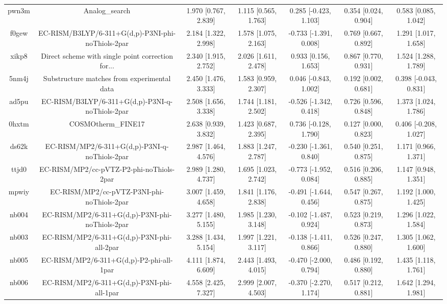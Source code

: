 \documentclass{article}
\begin{document}
\begin{center}
\begin{longtable}{|ccccccc|}
 pwn3m &                                     Analog\_search &  1.970 [0.767, 2.839] &  1.115 [0.565, 1.763] &    0.285 [-0.423, 1.103] &  0.354 [0.024, 0.904] &   0.583 [0.085, 1.042] \\
 f0gew &  EC-RISM/B3LYP/6-311+G(d,p)-P3NI-phi-noThiols-2par &  2.184 [1.322, 2.998] &  1.578 [1.075, 2.163] &   -0.733 [-1.391, 0.008] &  0.769 [0.667, 0.892] &   1.291 [1.017, 1.658] \\
 xikp8 &  Direct scheme with single point correction for... &  2.340 [1.915, 2.752] &  2.026 [1.611, 2.478] &     0.933 [0.156, 1.653] &  0.867 [0.770, 0.931] &   1.524 [1.288, 1.789] \\
 5nm4j &        Substructure matches from experimental data &  2.450 [1.476, 3.333] &  1.583 [0.959, 2.307] &    0.046 [-0.843, 1.002] &  0.192 [0.002, 0.681] &  0.398 [-0.043, 0.831] \\
 ad5pu &    EC-RISM/B3LYP/6-311+G(d,p)-P3NI-q-noThiols-2par &  2.508 [1.656, 3.338] &  1.744 [1.181, 2.502] &   -0.526 [-1.342, 0.418] &  0.726 [0.596, 0.848] &   1.373 [1.024, 1.786] \\
 0hxtm &                                 COSMOtherm\_FINE17 &  2.638 [0.939, 3.832] &  1.423 [0.687, 2.395] &    0.736 [-0.128, 1.790] &  0.127 [0.000, 0.823] &  0.406 [-0.208, 1.027] \\
 ds62k &      EC-RISM/MP2/6-311+G(d,p)-P3NI-q-noThiols-2par &  2.987 [1.464, 4.576] &  1.883 [1.247, 2.787] &   -0.230 [-1.361, 0.840] &  0.540 [0.251, 0.875] &   1.171 [0.966, 1.371] \\
 ttjd0 &           EC-RISM/MP2/cc-pVTZ-P2-phi-noThiols-2par &  2.989 [1.280, 4.737] &  1.695 [1.023, 2.742] &   -0.773 [-1.952, 0.084] &  0.516 [0.206, 0.885] &   1.147 [0.948, 1.351] \\
 mpwiy &         EC-RISM/MP2/cc-pVTZ-P3NI-phi-noThiols-2par &  3.007 [1.459, 4.658] &  1.841 [1.176, 2.838] &   -0.491 [-1.644, 0.456] &  0.547 [0.267, 0.875] &   1.192 [1.000, 1.425] \\
 nb004 &    EC-RISM/MP2/6-311+G(d,p)-P3NI-phi-noThiols-2par &  3.277 [1.480, 5.155] &  1.985 [1.230, 3.148] &   -0.102 [-1.487, 0.924] &  0.523 [0.219, 0.873] &   1.296 [1.022, 1.584] \\
 nb003 &         EC-RISM/MP2/6-311+G(d,p)-P3NI-phi-all-2par &  3.288 [1.434, 5.154] &  1.997 [1.221, 3.117] &   -0.138 [-1.411, 0.866] &  0.526 [0.247, 0.880] &   1.305 [1.062, 1.600] \\
 nb005 &           EC-RISM/MP2/6-311+G(d,p)-P2-phi-all-1par &  4.111 [1.874, 6.609] &  2.443 [1.493, 4.015] &   -0.470 [-2.000, 0.794] &  0.486 [0.192, 0.880] &   1.435 [1.118, 1.761] \\
 nb006 &         EC-RISM/MP2/6-311+G(d,p)-P3NI-phi-all-1par &  4.558 [2.425, 7.327] &  2.999 [2.007, 4.503] &   -0.370 [-2.270, 1.174] &  0.517 [0.212, 0.881] &   1.642 [1.294, 1.981] \\
\end{longtable}
\end{center}
\end{document}
